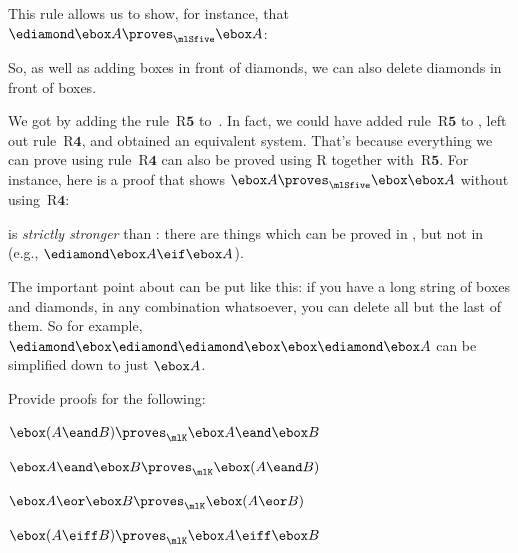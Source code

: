 This rule allows us to show, for instance, that $\ediamond\ebox A\proves_\mlSfive  \ebox A$:
\begin{fitchproof}
	\PR
	\open
	\AS
	\open
	\AS
	\close
	\close
\end{fitchproof}

So, as well as adding boxes in front of diamonds, we can also delete diamonds in front of boxes.

We got \mlSfive{} by adding the rule~R$\mathbf{5}$ to~\mlSfour. In
fact, we could have added rule~R$\mathbf{5}$ to \mlT{}, left out
rule~R$\mathbf{4}$, and obtained an equivalent system. That's because
everything we can prove using rule~R$\mathbf{4}$ can also be proved
using R\mlT{} together with~R$\mathbf{5}$. For instance, here is a
proof that shows $\ebox A \proves_\mlSfive \ebox\ebox A$ without
using~R$\mathbf{4}$:
\begin{fitchproof}
	\PR
	\open
	\AS
	\close
	\open
	\AS
	\open
	\AS
	\open
	\AS
	\close
	\close
	\close
\end{fitchproof}
\mlSfive{} is \emph{strictly stronger} than \mlSfour: there are things which can be proved in \mlSfive, but not in \mlSfour{} (e.g., $\ediamond\ebox A \eif \ebox A$).

The important point about \mlSfive{} can be put like this: if you have a long string of boxes and diamonds, in any combination whatsoever, you can delete all but the last of them. So for example, $\ediamond\ebox\ediamond\ediamond\ebox\ebox\ediamond\ebox A$ can be simplified down to just $\ebox A$.

\practiceproblems

\problempart
Provide proofs for the following:
\begin{compactlist}
	\item $\ebox (A\eand B)\proves_\mlK\ebox A \eand \ebox B$
	\item $\ebox A\eand\ebox B\proves_\mlK\ebox( A \eand  B)$
	\item $\ebox A\eor\ebox B\proves_\mlK\ebox( A \eor  B)$
	\item $\ebox (A \eiff B)\proves_\mlK \ebox A \eiff \ebox B$
\end{compactlist}

